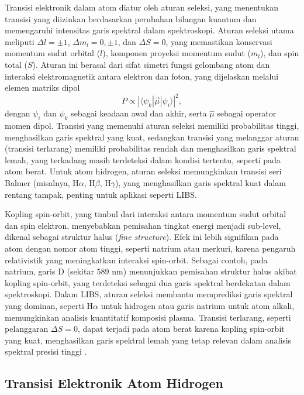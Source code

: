 Transisi elektronik dalam atom diatur oleh aturan seleksi, yang menentukan transisi yang diizinkan berdasarkan perubahan bilangan kuantum dan memengaruhi intensitas garis spektral dalam spektroskopi. Aturan seleksi utama meliputi \( \Delta l = \pm 1 \), \( \Delta m_l = 0, \pm 1 \), dan \( \Delta S = 0 \), yang memastikan konservasi momentum sudut orbital (\( l \)), komponen proyeksi momentum sudut (\( m_l \)), dan spin total (\( S \)). Aturan ini berasal dari sifat simetri fungsi gelombang atom dan interaksi elektromagnetik antara elektron dan foton, yang dijelaskan melalui elemen matriks dipol
\begin{equation}
P \propto |\langle \psi_k | \vec{\mu} | \psi_i \rangle|^2, \label{eq:dipole}
\end{equation}
dengan \( \psi_i \) dan \( \psi_k \) sebagai keadaan awal dan akhir, serta \( \hat{\mu} \) sebagai operator momen dipol. Transisi yang memenuhi aturan seleksi memiliki probabilitas tinggi, menghasilkan garis spektral yang kuat, sedangkan transisi yang melanggar aturan (transisi terlarang) memiliki probabilitas rendah dan menghasilkan garis spektral lemah, yang terkadang masih terdeteksi dalam kondisi tertentu, seperti pada atom berat. Untuk atom hidrogen, aturan seleksi memungkinkan transisi seri Balmer (misalnya, H\(\alpha\), H\(\beta\), H\(\gamma\)), yang menghasilkan garis spektral kuat dalam rentang tampak, penting untuk aplikasi seperti LIBS. 
\par Kopling spin-orbit, yang timbul dari interaksi antara momentum sudut orbital dan spin elektron, menyebabkan pemisahan tingkat energi menjadi sub-level, dikenal sebagai struktur halus (\textit{fine structure}). Efek ini lebih signifikan pada atom dengan nomor atom tinggi, seperti natrium atau merkuri, karena pengaruh relativistik yang meningkatkan interaksi spin-orbit. Sebagai contoh, pada natrium, garis D (sekitar 589 nm) menunjukkan pemisahan struktur halus akibat kopling spin-orbit, yang terdeteksi sebagai dua garis spektral berdekatan dalam spektroskopi. Dalam LIBS, aturan seleksi membantu memprediksi garis spektral yang dominan, seperti H\(\alpha\) untuk hidrogen atau garis natrium untuk atom alkali, memungkinkan analisis kuantitatif komposisi plasma. Transisi terlarang, seperti pelanggaran \( \Delta S = 0 \), dapat terjadi pada atom berat karena kopling spin-orbit yang kuat, menghasilkan garis spektral lemah yang tetap relevan dalam analisis spektral presisi tinggi \citep{Griffiths2005, CremersRadzemski2013, Demtroder2010}.

\subsection{Transisi Elektronik Atom Hidrogen}

